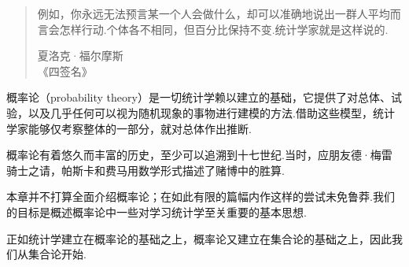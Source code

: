 

\begin{quote}
例如，你永远无法预言某一个人会做什么，却可以准确地说出一群人平均而言会怎样行动.个体各不相同，但百分比保持不变.统计学家就是这样说的.
\begin{flushright}夏洛克·福尔摩斯\\《四签名》\end{flushright}
\end{quote}
概率论（probability theory）是一切统计学赖以建立的基础，它提供了对总体、试验，以及几乎任何可以视为随机现象的事物进行建模的方法.借助这些模型，统计学家能够仅考察整体的一部分，就对总体作出推断.

概率论有着悠久而丰富的历史，至少可以追溯到十七世纪.当时，应朋友德·梅雷骑士之请，帕斯卡和费马用数学形式描述了赌博中的胜算.

本章并不打算全面介绍概率论；在如此有限的篇幅内作这样的尝试未免鲁莽.我们的目标是概述概率论中一些对学习统计学至关重要的基本思想.

正如统计学建立在概率论的基础之上，概率论又建立在集合论的基础之上，因此我们从集合论开始.
